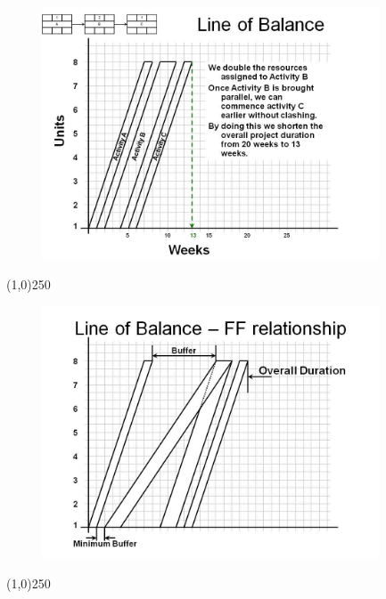 \begin{frame}
\begin{figure}
	\centering
		\includegraphics[width = 10.0cm]{oldnotes/Slide253.jpg}
\end{figure}
\end{frame}
\begin{center}\line(1,0){250}\end{center}






\begin{frame}
\begin{figure}
	\centering
		\includegraphics[width = 10.0cm]{oldnotes/Slide255.jpg}
\end{figure}
\end{frame}
\begin{center}\line(1,0){250}\end{center}







